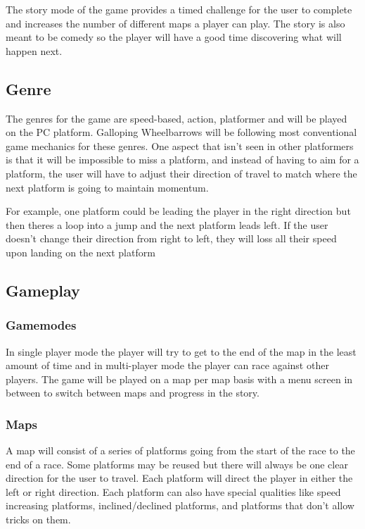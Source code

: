 \documentclass[12pt,]{article}
\begin{document}
The story mode of the game provides a timed challenge for the user to
complete and increases the number of different maps a player can play.
The story is also meant to be comedy so the player will have a good time
discovering what will happen next.

\hypertarget{genre}{%
\subsection{Genre}\label{genre}}

The genres for the game are speed-based, action, platformer and will be
played on the PC platform. Galloping Wheelbarrows will be following most
conventional game mechanics for these genres. One aspect that isn't seen
in other platformers is that it will be impossible to miss a platform,
and instead of having to aim for a platform, the user will have to
adjust their direction of travel to match where the next platform is
going to maintain momentum.

For example, one platform could be leading the player in the right
direction but then theres a loop into a jump and the next platform leads
left. If the user doesn't change their direction from right to left,
they will loss all their speed upon landing on the next platform

\hypertarget{gameplay}{%
\subsection{Gameplay}\label{gameplay}}

\hypertarget{gamemodes}{%
\subsubsection{Gamemodes}\label{gamemodes}}

In single player mode the player will try to get to the end of the map
in the least amount of time and in multi-player mode the player can race
against other players. The game will be played on a map per map basis
with a menu screen in between to switch between maps and progress in the
story.

\hypertarget{maps}{%
\subsubsection{Maps}\label{maps}}

A map will consist of a series of platforms going from the start of the
race to the end of a race. Some platforms may be reused but there will
always be one clear direction for the user to travel. Each platform will
direct the player in either the left or right direction. Each platform
can also have special qualities like speed increasing platforms,
inclined/declined platforms, and platforms that don't allow tricks on
them.
\end{document}

